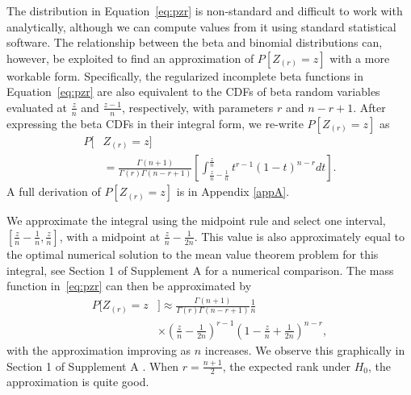 \documentclass[12pt]{article}
\theoremstyle{plain}
\begin{document}
The distribution in Equation~\eqref{eq:pzr} is non-standard and difficult to work with analytically, although we can compute values from it using standard statistical software. The relationship between the beta and binomial distributions can, however, be exploited to find an approximation of $P\left[ Z_{(r)} = z \right]$ with a more workable form. Specifically, the regularized incomplete beta functions in Equation~\eqref{eq:pzr} are also equivalent to the CDFs of beta random variables evaluated at $\frac{z}{n}$ and $\frac{z-1}{n}$, respectively, with parameters $r$ and $n - r + 1$. After expressing the beta CDFs in their integral form, we re-write $P\left[ Z_{(r)} = z \right]$ as
\begin{align*}
	P\bigg[ &Z_{(r)} = z \bigg]\\
	&=  \frac{\Gamma(n+1)}{\Gamma(r)\Gamma(n - r + 1)} \left[ \int_{\frac{z}{n}-\frac{1}{n}}^{\frac{z}{n}} t^{r-1}\left(1-t\right)^{n-r } dt \right]. 
\end{align*}
A full derivation of $P\left[ Z_{(r)} = z \right]$ is in Appendix \ref{appA}.

We approximate the integral using the midpoint rule and select one interval, $[\frac{z}{n} - \frac{1}{n}, \frac{z}{n}]$, with a midpoint at $\frac{z}{n} - \frac{1}{2n}$. This value is also approximately equal to the optimal numerical solution to the mean value theorem problem for this integral, see Section 1 of Supplement A \citep{DRTSup2024A} for a numerical comparison.  The mass function in~\eqref{eq:pzr} can then be approximated by
\begin{align}
	P\bigg[ Z_{(r)} = z &\bigg] \approx \frac{\Gamma(n+1)}{\Gamma(r)\Gamma(n - r + 1)} \frac{1}{n}  \label{eq:pmf} \\
	& \times  \left(\frac{z}{n} - \frac{1}{2n}\right)^{r-1} \left(1-\frac{z}{n} + \frac{1}{2n}\right)^{n-r}, \nonumber
\end{align}
with the approximation improving as $n$ increases. We observe this graphically in Section 1 of Supplement A \citep{DRTSup2024A}. When $r = \frac{n+1}{2}$, the expected rank under $H_0$, the approximation is quite good.

\end{document}
